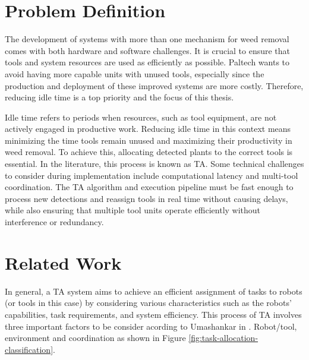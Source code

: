 \section{Problem Definition}

The development of systems with more than one mechanism for weed removal comes with both hardware and software challenges. It is crucial to ensure that tools and system resources are used as efficiently as possible. Paltech wants to avoid having more capable units with unused tools, especially since the production and deployment of these improved systems are more costly. Therefore, reducing idle time is a top priority and the focus of this thesis.


Idle time refers to periods when resources, such as tool equipment, are not actively engaged in productive work. Reducing idle time in this context means minimizing the time tools remain unused and maximizing their productivity in weed removal. To achieve this, allocating detected plants to the correct tools is essential. In the literature, this process is known as \ac{TA}. Some technical challenges to consider during implementation include computational latency and multi-tool coordination. The \ac{TA} algorithm and execution pipeline must be fast enough to process new detections and reassign tools in real time without causing delays, while also ensuring that multiple tool units operate efficiently without interference or redundancy.

\section{Related Work}

In general, a \ac{TA} system aims to achieve an efficient assignment of tasks to robots (or tools in this case) by considering various characteristics such as the robots' capabilities, task requirements, and system efficiency. This process of \ac{TA} involves three important factors to be consider acording to Umashankar in \cite{Umashankar2024}. Robot/tool, environment and coordination as shown in Figure \ref{fig:task-allocation-classification}.

